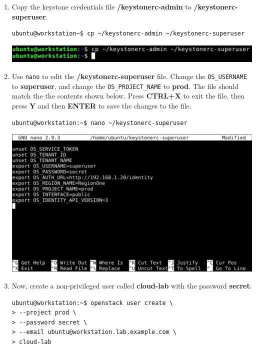\documentclass[letterpaper, 12pt]{article}
\begin{document}
\begin{enumerate}
    \item Copy the keystone credentials file \textbf{\texttildemid/keystonerc-admin} to
    \textbf{\texttildemid/keystonerc-superuser}.
\begin{lstlisting}
ubuntu@workstation~$ cp ~/keystonerc-admin ~/keystonerc-superuser
\end{lstlisting}

    \begin{center}
        \includegraphics[width=\linewidth]{images/part1/step7.png}
    \end{center}

    \item Use \texttt{nano} to edit the \textbf{\texttildemid/keystonerc-superuser} file. Change the
    \texttt{OS\_USERNAME} to \textbf{superuser}, and change the \texttt{OS\_PROJECT\_NAME} to \textbf{prod}. The file
    should match the the contents shown below. Press \textbf{CTRL+X} to exit the file, then press \textbf{Y} and then
    \textbf{ENTER} to save the changes to the file.
\begin{lstlisting}
ubuntu@workstation:~$ nano ~/keystonerc-superuser
\end{lstlisting}    

    \begin{center}
        \includegraphics[width=\linewidth]{images/part1/step8.png}
    \end{center}

    \item Now, create a non-privileged user called \textbf{cloud-lab} with the password \textbf{secret}.
\begin{lstlisting}
ubuntu@workstation:~$ openstack user create \
> --project prod \
> --password secret \
> --email ubuntu@workstation.lab.example.com \
> cloud-lab
\end{lstlisting}


\end{enumerate}
\end{document}
